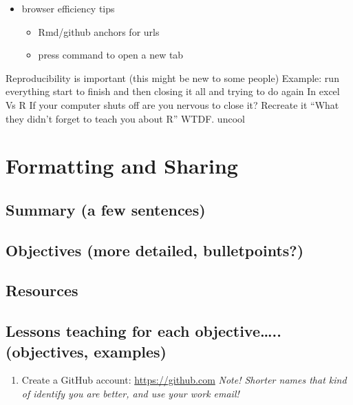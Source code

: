 \documentclass[]{book}
\providecommand{\tightlist}{%
  \setlength{\itemsep}{0pt}\setlength{\parskip}{0pt}}
\begin{document}
\begin{itemize}
\tightlist
\item
  browser efficiency tips

  \begin{itemize}
  \tightlist
  \item
    Rmd/github anchors for urls
  \item
    press command to open a new tab
  \end{itemize}
\end{itemize}

Reproducibility is important (this might be new to some people)
Example: run everything start to finish and then closing it all and trying to do again
In excel
Vs R
If your computer shuts off are you nervous to close it?
Recreate it
``What they didn't forget to teach you about R'' WTDF. uncool

\hypertarget{format}{%
\chapter{Formatting and Sharing}\label{format}}

\hypertarget{summary-a-few-sentences-4}{%
\section{Summary (a few sentences)}\label{summary-a-few-sentences-4}}

\hypertarget{objectives-more-detailed-bulletpoints-4}{%
\section{Objectives (more detailed, bulletpoints?)}\label{objectives-more-detailed-bulletpoints-4}}

\hypertarget{resources-6}{%
\section{Resources}\label{resources-6}}

\hypertarget{lessons-teaching-for-each-objective..-objectives-examples-2}{%
\section{Lessons teaching for each objective\ldots{}.. (objectives, examples)}\label{lessons-teaching-for-each-objective..-objectives-examples-2}}

\begin{enumerate}
\def\labelenumi{\arabic{enumi}.}
\tightlist
\item
  Create a GitHub account: \url{https://github.com} \emph{Note! Shorter names that kind of identify you are better, and use your work email!}
\end{enumerate}
\end{document}
